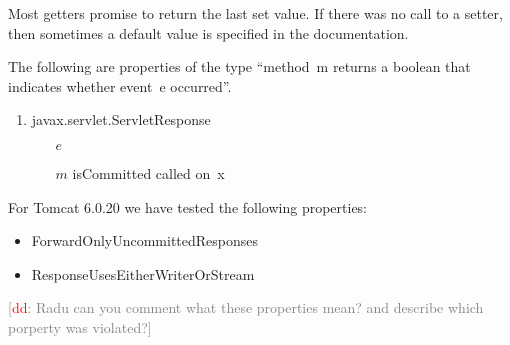 \documentclass{sigplanconf}[10pt] %
\newcommand{\noterg}[2]{\textcolor{gray}{[\textcolor{red}{#1}: #2]}}
\newcommand{\dd}[1]{\noterg{dd}{#1}}
\newcommand{\dinocomment}[1]{\dd{#1}}
\begin{document}
Most getters promise to return the last set value.
If there was no call to a setter, then sometimes a default value is specified in the documentation.

The following are properties of the type ``method~\textsf{m} returns a boolean that indicates whether event~\textsf{e} occurred''.

\begin{enumerate}
\item
\textsf{javax.servlet.ServletResponse}
  \begin{itemize}
  \item[$e$] 
  \item[$m$] \textsf{isCommitted} called on~\textsf{x}
  \end{itemize}
\end{enumerate}

For Tomcat  6.0.20  we have tested the following properties:
\begin{itemize}
\item ForwardOnlyUncommittedResponses
\item ResponseUsesEitherWriterOrStream
\end{itemize}
\dinocomment{Radu can you comment what these properties mean? and describe which porperty was violated?}


\end{document}
